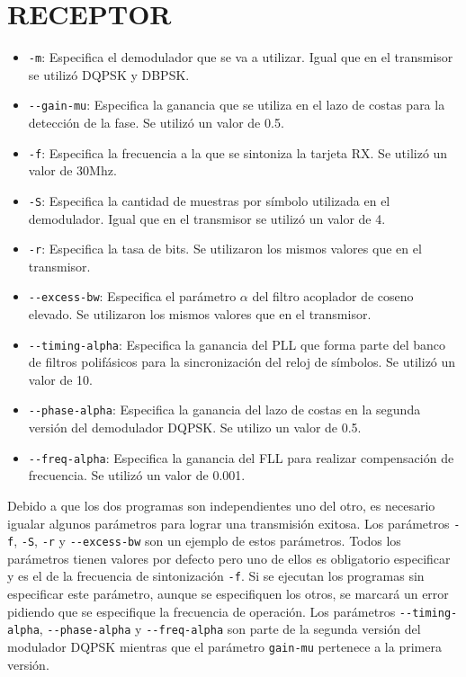 \section*{RECEPTOR}
\begin{itemize}
  \item \verb|-m|: Especifica el demodulador que se va a utilizar. Igual que en el transmisor se
  utiliz\'o DQPSK y DBPSK.
  \item \verb|--gain-mu|: Especifica la ganancia que se utiliza en el lazo de costas para la
  detecci\'on de la fase. Se utiliz\'o un valor de 0.5.
  \item \verb|-f|: Especifica la frecuencia a la que se sintoniza la tarjeta RX. Se utiliz\'o un
  valor de 30Mhz.
  \item \verb|-S|: Especifica la cantidad de muestras por s\'imbolo utilizada en el demodulador.
  Igual que en el transmisor se utiliz\'o un valor de 4.
  \item \verb|-r|: Especifica la tasa de bits. Se utilizaron los mismos valores que en el
  transmisor.
  \item \verb|--excess-bw|: Especifica el par\'ametro $\alpha$ del filtro acoplador de coseno
  elevado. Se utilizaron los mismos valores que en el transmisor.
  \item \verb|--timing-alpha|: Especifica la ganancia del PLL que forma parte del banco de filtros
  polif\'asicos para la sincronizaci\'on del reloj de s\'imbolos. Se utiliz\'o un valor de 10.
  \item \verb|--phase-alpha|: Especifica la ganancia del lazo de costas en la segunda versi\'on
  del demodulador DQPSK. Se utilizo un valor de 0.5.
  \item \verb|--freq-alpha|: Especifica la ganancia del FLL para realizar compensaci\'on de
  frecuencia. Se utiliz\'o un valor de 0.001.
\end{itemize}

Debido a que los dos programas son independientes uno del otro, es necesario igualar algunos par\'ametros para lograr una
transmisi\'on exitosa. Los par\'ametros \verb|-f|, \verb|-S|, \verb|-r| y \verb|--excess-bw| son un ejemplo de estos
par\'ametros. Todos los par\'ametros tienen valores por defecto pero uno de ellos es obligatorio especificar y es el de la
frecuencia de sintonizaci\'on \verb|-f|. Si se ejecutan los programas sin especificar este par\'ametro, aunque se especifiquen
los otros, se marcar\'a un error pidiendo que se especifique la frecuencia de operaci\'on. Los par\'ametros \verb|--timing-alpha|,
\verb|--phase-alpha| y \verb|--freq-alpha| son parte de la segunda versi\'on del modulador DQPSK mientras que el par\'ametro
\verb|gain-mu| pertenece a la primera versi\'on.
